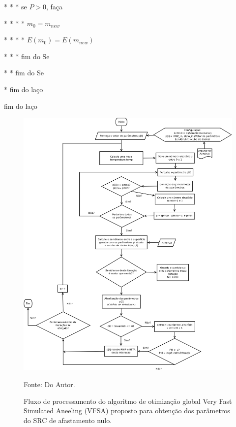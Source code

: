 * * * se $P > 0$, faça

* * * * $m_0=m_{new}$

* * * * $E(m_0)=E(m_{new})$

* * * fim do Se

* * fim do Se

* fim do laço

fim do laço

\vspace{\onelineskip} 

\begin{figure}[htb]
\caption{Fluxo de processamento do algoritmo de otimização global Very Fast Simulated Aneeling (VFSA)
proposto para obtenção dos parâmetros do SRC de afastamento nulo.}
\begin{center}
\includegraphics[scale=0.45]{images/VFSA.png}
\vspace{-0.3cm}
\end{center}
\begin{center}
 Fonte: Do Autor.
\end{center}
\label{fig:3.1}
\end{figure}

